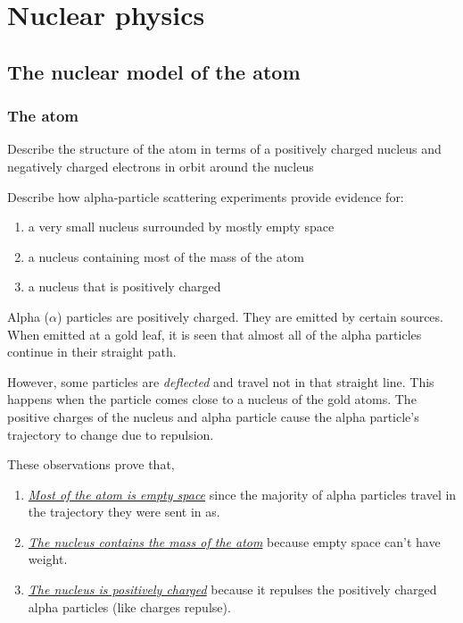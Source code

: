 \section{Nuclear physics}
\subsection{The nuclear model of the atom}
\subsubsection{The atom}

\begin{subpoint}
Describe the structure of the atom in terms of a positively charged nucleus and negatively charged
electrons in orbit around the nucleus
\end{subpoint}

\begin{subpoint}
Describe how alpha-particle scattering experiments provide evidence for:
\begin{enumerate}[label=(\alph*)]
	\setlength\itemsep{0pt}
	\item a very small nucleus surrounded by mostly empty space
	\item a nucleus containing most of the mass of the atom
	\item a nucleus that is positively charged
\end{enumerate}
\end{subpoint}

Alpha ($\alpha$) particles are positively charged. They are emitted by certain sources.
When emitted at a gold leaf, it is seen that almost all of the alpha particles continue
in their straight path. 

However, some particles are \emph{deflected} and travel not in
that straight line. This happens when the particle comes close to a nucleus of the
gold atoms. The positive charges of the nucleus and alpha particle cause the alpha 
particle's trajectory to change due to repulsion.

These observations prove that, 
\begin{enumerate}[label=(\roman*)]
	\item \ul{\emph{Most of the atom is empty space}} since the majority of alpha
		particles travel in the trajectory they were sent in as.
	\item \emph{\ul{The nucleus contains the mass of the atom}} because empty space
		can't have weight.
	\item \emph{\ul{The nucleus is positively charged}} because it repulses the 
		positively charged alpha particles (like charges repulse).
\end{enumerate}

